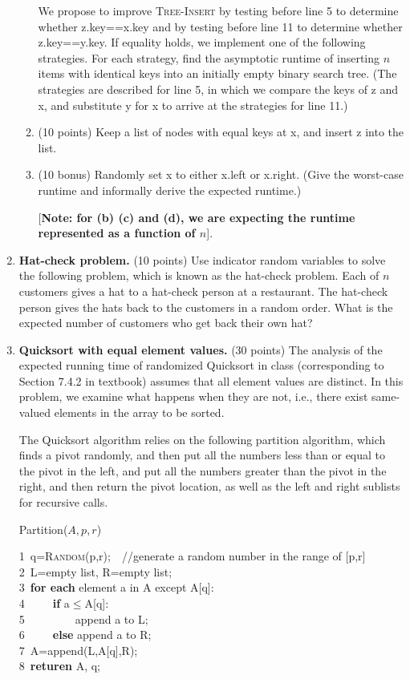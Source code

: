 \documentclass[12pt]{article}
\begin{document}
\begin{enumerate}
\begin{enumerate}
		We propose to improve \textsc{Tree-Insert} by testing before line 5 to determine whether z.key==x.key and by testing before line 11 to determine whether z.key==y.key. If equality holds, we implement one of the following strategies. For each strategy, find the asymptotic runtime of inserting $n$ items with identical keys into an initially empty binary search tree. (The strategies are described for line 5, in which we compare the keys of z and x, and substitute y for x to arrive at the strategies for line 11.)
		\item (10 points) Keep a list of nodes with equal keys at x, and insert z into the list.
		\item (10 bonus) Randomly set x to either x.left or x.right. (Give the worst-case runtime and informally derive the expected runtime.)
		
		[\textbf{Note: for (b) (c) and (d), we are expecting the runtime represented as a function of $n$}].
	\end{enumerate}

	\item \textbf{Hat-check problem.} (10 points) Use indicator random variables to solve the following problem, which is known as the hat-check problem. Each of $n$ customers gives a hat to a hat-check person at a restaurant. The hat-check person gives the hats back to the customers in a random order. What is the expected number of customers who get back their own hat?


	\item \textbf{Quicksort with equal element values.} (30 points) The analysis of the expected running time of randomized Quicksort in class (corresponding to Section 7.4.2 in textbook) assumes that all element values are distinct. In this problem, we examine what happens when they are not, i.e., there exist same-valued elements in the array to be sorted.
	
	The Quicksort algorithm relies on the following partition algorithm, which finds a pivot randomly, and then put all the numbers less than or equal to the pivot in the left, and put all the numbers greater than the pivot in the right, and then return the pivot location, as well as the left and right sublists for recursive calls.
		\begin{algorithm}
		\caption{Partition($A, p, r$)}
		1~q=\textsc{Random}(p,r);~~//generate a random number in the range of [p,r]\\
		2~L=empty list, R=empty list;\\
		3~\textbf{for each} element a in A except A[q]:\\
		4~~~~~\textbf{if} a$\le$A[q]:\\
		5~~~~~~~~~append a to L;\\
		6~~~~~\textbf{else} append a to R;\\
		7~A=append(L,A[q],R);\\
		8~\textbf{returen} A, q;
	\end{algorithm}
	

\end{enumerate}
\end{document}
